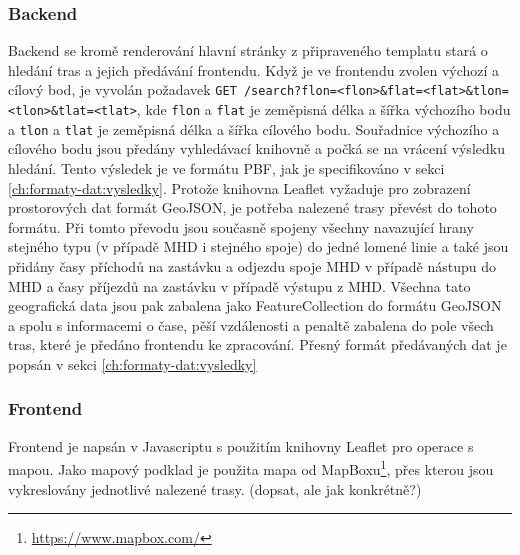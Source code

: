\subsubsection{Backend}
Backend se kromě renderování hlavní stránky z připraveného templatu stará o
hledání tras a jejich předávání frontendu. Když je ve frontendu zvolen výchozí a
cílový bod, je vyvolán požadavek {\tt GET
/search?flon=<flon>\&flat=<flat>\&tlon=<tlon>\&tlat=<tlat>}, kde {\tt flon} a
{\tt flat} je zeměpisná délka a šířka výchozího bodu a {\tt tlon} a {\tt tlat}
je zeměpisná délka a šířka cílového bodu. Souřadnice výchozího a cílového bodu
jsou předány vyhledávací knihovně a počká se na vrácení výsledku hledání. Tento
výsledek je ve formátu PBF, jak je specifikováno v sekci \ref{ch:formaty-dat:vysledky}.
Protože knihovna Leaflet vyžaduje pro zobrazení prostorových dat formát
GeoJSON\cite{GeoJSON}, je potřeba nalezené trasy převést do tohoto formátu. Při
tomto převodu jsou současně spojeny všechny navazující hrany stejného typu (v
případě MHD i stejného spoje) do jedné lomené linie a také jsou přidány časy
příchodů na zastávku a odjezdu spoje MHD v případě nástupu do MHD a časy
příjezdů na zastávku v případě výstupu z MHD. Všechna tato geografická data jsou
pak zabalena jako FeatureCollection do formátu GeoJSON a spolu s informacemi o
čase, pěší vzdálenosti a penaltě zabalena do pole všech tras, které je předáno
frontendu ke zpracování. Přesný formát předávaných dat je popsán v sekci \ref{ch:formaty-dat:vysledky}
\subsubsection{Frontend}
Frontend je napsán v Javascriptu s použitím knihovny Leaflet pro operace s
mapou. Jako mapový podklad je použita mapa od
MapBoxu\footnote{\url{https://www.mapbox.com/}}, přes kterou
jsou vykreslovány jednotlivé nalezené trasy. (\TODO dopsat, ale jak konkrétně?)
